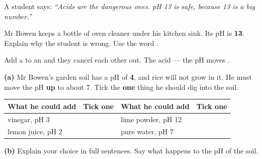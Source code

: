\documentclass[12pt,a4paper]{article}
\newcommand{\qlines}[1]{\par\needspace{\numexpr#1+1\relax\baselineskip}\wlines{#1}}
\begin{document}
\noindent A student says: \emph{``Acids are the dangerous ones. pH 13 is safe, because
13 is a big number.''}

\vspace{4pt}
\noindent Mr Bowen keeps a bottle of oven cleaner under his kitchen sink. Its pH is
\textbf{13}. Explain why the student is wrong. Use the word .
\qlines{3}


\begin{remember}
  Add a  to an  and they cancel each other out. The acid
   --- the pH moves .
\end{remember}

\noindent \textbf{(a)} Mr Bowen's garden soil has a pH of \textbf{4}, and rice will not
grow in it. He must move the pH \textbf{up} to about 7. Tick the \textbf{one} thing he
should dig into the soil.

\vspace{4pt}
\noindent
\begin{tabularx}{\textwidth}{|L|c|L|c|}
  \hline
  \textbf{What he could add} & \textbf{Tick one} & \textbf{What he could add} &
  \textbf{Tick one} \\
  \hline
  vinegar, pH 3 \rule[-0.6em]{0pt}{1.9em} & &
  lime powder, pH 12 \rule[-0.6em]{0pt}{1.9em} & \\ \hline
  lemon juice, pH 2 \rule[-0.6em]{0pt}{1.9em} & &
  pure water, pH 7 \rule[-0.6em]{0pt}{1.9em} & \\ \hline
\end{tabularx}

\vspace{7pt}
\noindent \textbf{(b)} Explain your choice in full sentences. Say what happens to the
pH of the soil.
\qlines{3}


\end{document}
